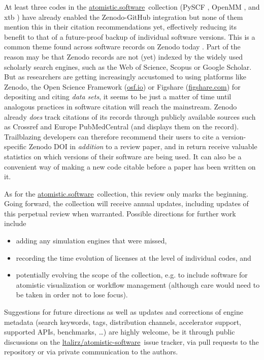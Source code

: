 \documentclass[9pt,review,pubversion]{livecoms}
\newcommand{\atsoft}{\href{https://atomistic.software}{atomistic.software}\ }
\newcommand{\atsoftgit}{\href{https://github.com/ltalirz/atomistic-software}{ltalirz/atomistic-software}\ }
\begin{document}
At least three codes in the \atsoft collection (PySCF \cite{Sun2020a,Sun2020b}, OpenMM \cite{Eastman2017,Eastman2020}, and xtb \cite{Bannwarth2021,Grimme2021}) have already enabled the Zenodo-GitHub integration but none of them mention this in their citation recommendations yet, effectively reducing its benefit to that of a future-proof backup of individual software versions.
This is a common theme found across software records on Zenodo today \cite{vandeSandt2019}.
Part of the reason may be that Zenodo records are not (yet) indexed by the widely used scholarly search engines, such as the Web of Science, Scopus or Google Scholar.
But as researchers are getting increasingly accustomed to using platforms like Zenodo, the Open Science Framework (\href{https://osf.io}{osf.io}) or Figshare (\href{https://figshare.com}{figshare.com}) for depositing and citing \emph{data sets}, it seems to be just a matter of time until analogous practices in software citation will reach the mainstream.
Zenodo already \emph{does} track citations of its records through publicly available sources such as Crossref and Europe PubMedCentral (and displays them on the record). 
Trailblazing developers can therefore recommend their users to cite a version-specific Zenodo DOI in \emph{addition} to a review paper, and in return receive valuable statistics on which versions of their software are being used.
It can also be a convenient way of making a new code citable before a paper has been written on it.

As for the \atsoft collection, this review only marks the beginning.
Going forward, the collection will receive annual updates, including updates of this perpetual review when warranted.
Possible directions for further work include
\begin{itemize}
    \item 
adding any simulation engines that were missed, 
    \item 
recording the time evolution of licenses at the level of individual codes, and
    \item 
potentially evolving the scope of the collection, e.g. to include software for atomistic visualization or workflow management (although care would need to be taken in order not to lose focus).
\end{itemize}
Suggestions for future directions as well as updates and corrections of engine metadata (search keywords, tags, distribution channels, accelerator support, supported APIs, benchmarks, \ldots) are highly welcome,
be it through public discussions on the \atsoftgit issue tracker, via pull requests to the repository or via private communication to the authors.
\end{document}
